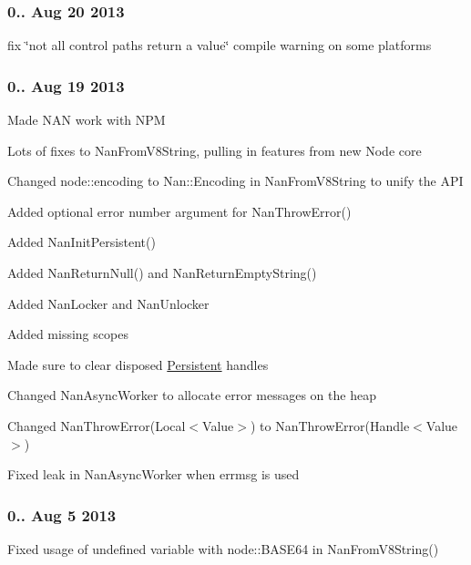 \subsubsection*{0.. Aug 20 2013}


\begin{DoxyItemize}
\item fix \char`\"{}not all control paths return a value\char`\"{} compile warning on some platforms
\end{DoxyItemize}

\subsubsection*{0.. Aug 19 2013}


\begin{DoxyItemize}
\item Made N\+AN work with N\+PM
\item Lots of fixes to Nan\+From\+V8\+String, pulling in features from new Node core
\item Changed node\+::encoding to Nan\+::\+Encoding in Nan\+From\+V8\+String to unify the A\+PI
\item Added optional error number argument for Nan\+Throw\+Error()
\item Added Nan\+Init\+Persistent()
\item Added Nan\+Return\+Null() and Nan\+Return\+Empty\+String()
\item Added Nan\+Locker and Nan\+Unlocker
\item Added missing scopes
\item Made sure to clear disposed \hyperlink{class_persistent}{Persistent} handles
\item Changed Nan\+Async\+Worker to allocate error messages on the heap
\item Changed Nan\+Throw\+Error(\+Local$<$\+Value$>$) to Nan\+Throw\+Error(\+Handle$<$\+Value$>$)
\item Fixed leak in Nan\+Async\+Worker when errmsg is used
\end{DoxyItemize}

\subsubsection*{0.. Aug 5 2013}


\begin{DoxyItemize}
\item Fixed usage of undefined variable with node\+::\+B\+A\+S\+E64 in Nan\+From\+V8\+String()
\end{DoxyItemize}


